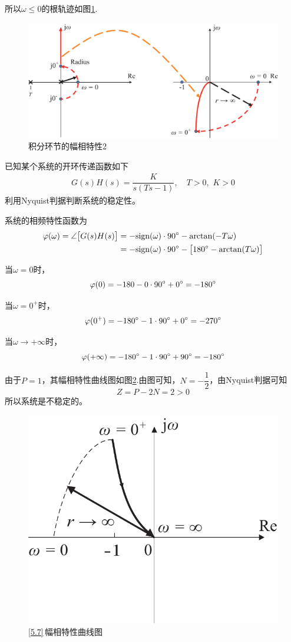 所以$\omega \le 0$的根轨迹如图\ref{积分环节的幅相特性2}.
\begin{figure}[!htb]
	\centering
	\includegraphics[width=0.7\linewidth]{pic/积分环节幅相特性2.pdf}
	\caption{积分环节的幅相特性2}
	\label{积分环节的幅相特性2}
\end{figure}

\vspace*{-3em}
\examples \label{5.7}已知某个系统的开环传递函数如下
\begin{align*}
	G(s)H(s) = \dfrac{K}{s(Ts - 1)}, \quad T>0,\,\, K>0
\end{align*}
利用Nyquist判据判断系统的稳定性。

\solve  系统的相频特性函数为
\begin{align*}
	\varphi(\omega) = \angle\big[G(s)H(s)\big] &= - \text{sign}(\omega)\cdot 90{}^{\circ} -\arctan(-T\omega) \\
	&= - \text{sign}(\omega) \cdot 90{}^{\circ} -\big[180{}^{\circ} - \arctan(T\omega)\big]
\end{align*}

当$\omega = 0$时，
\[
	\varphi(0) =  -180 - 0 \cdot 90 {}^{\circ} + 0{}^{\circ} = -180 {}^{\circ}
\]

当$\omega = 0^+$时，
\[\varphi(0^+) = -180{}^{\circ} - 1 \cdot 90 {}^{\circ} + 0{}^{\circ}  = -270 {}^{\circ}\]

当$\omega \to +\infty$时，
\[
	\varphi(+\infty) = -180{}^{\circ} - 1 \cdot 90 {}^{\circ} + 90{}^{\circ}  = -180 {}^{\circ}
\]

由于$P = 1$，其幅相特性曲线图如图\ref{F5.7}.由图可知，$N = -\dfrac{1}{2}$，由Nyquist判据可知
\[
Z = P - 2N = 2 > 0
\]
所以系统是不稳定的。
\begin{figure}[!htb]
	\centering
	\includegraphics[width=0.3\linewidth]{pic/5.7.pdf}
	\vspace*{-1em}
	\caption{\ref{5.7}$\,$幅相特性曲线图}
	\label{F5.7}
\end{figure}
\vspace*{-0.5em}
